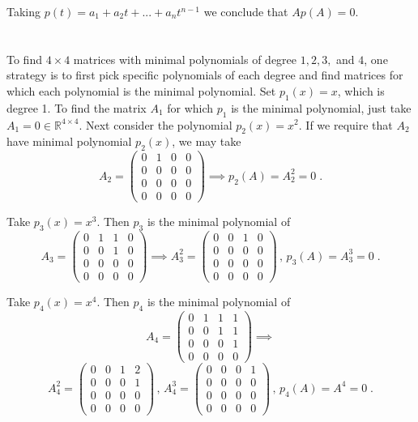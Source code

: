 \documentclass[11pt]{article}
\begin{document}
Taking $p(t) = a_1 + a_2 t + ... + a_n t^{n-1}$ we conclude that $Ap(A) = 0$. 

\section{}

To find $4 \times 4$ matrices with minimal polynomials of degree $1,2,3,$ and $4$, one strategy is to first pick specific polynomials of each degree and find matrices for which each polynomial is the minimal polynomial. Set $p_1(x) = x$, which is degree 1. To find the matrix $A_1$ for which $p_1$ is the minimal polynomial, just take $A_1 = 0 \in \mathbb{R}^{4 \times 4}$. Next consider the polynomial $p_2(x) = x^2$. If we require that $A_2$ have minimal polynomial $p_2(x)$, we may take $$A_2 = \begin{pmatrix}
0&1&0&0\\0&0&0&0\\0&0&0&0\\0&0&0&0
\end{pmatrix} \implies p_2(A) = A_2^2 = 0 \;.$$

Take $p_3(x) = x^3$. Then $p_3$ is the minimal polynomial of $$A_3 = \begin{pmatrix}
0&1&1&0\\0&0&1&0\\0&0&0&0\\0&0&0&0
\end{pmatrix} \implies A_3^2 = \begin{pmatrix}
0&0&1&0\\0&0&0&0\\0&0&0&0\\0&0&0&0
\end{pmatrix}\, ,\, p_3(A) = A_3^3 = 0\;.$$

Take $p_4(x) = x^4$. Then $p_4$ is the minimal polynomial of $$A_4 = \begin{pmatrix}
0&1&1&1\\0&0&1&1\\0&0&0&1\\0&0&0&0
\end{pmatrix} \implies $$
$$A_4^2 = \begin{pmatrix}
0&0&1&2\\0&0&0&1\\0&0&0&0\\0&0&0&0
\end{pmatrix} \, , \, A_4^3 = \begin{pmatrix}
0&0&0&1\\0&0&0&0\\0&0&0&0\\0&0&0&0
\end{pmatrix}\, ,\, p_4(A)=A^4 = 0 \;.$$
\end{document}
